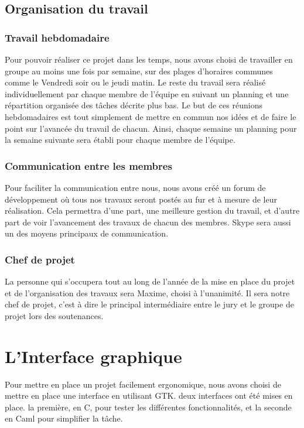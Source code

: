 \documentclass[12pt]{report}
\begin{document}
\section{Organisation du travail} %
		\subsection{Travail hebdomadaire}

Pour pouvoir réaliser ce projet dans les temps, nous avons choisi de travailler en groupe au moins une fois par semaine, sur des plages d'horaires communes comme le Vendredi soir ou le jeudi matin. Le reste du travail sera réalisé individuellement par chaque membre de l'équipe en suivant un planning et une répartition organisée des tâches décrite plus bas. Le but de ces réunions hebdomadaires est tout simplement de mettre en commun nos idées et de faire le point sur l'avancée du travail de chacun. Ainsi, chaque semaine un planning pour la semaine suivante sera établi pour chaque membre de l'équipe.

		\subsection{Communication entre les membres} %

Pour faciliter la communication entre nous, nous avons créé un forum de développement
o\`u tous nos travaux seront postés au fur et \`a  mesure de leur réalisation. Cela permettra d'une part, une meilleure gestion du travail, et d'autre part de voir l'avancement des travaux de chacun des membres. Skype sera aussi un des moyens principaux de communication.

		\subsection{Chef de projet}

La personne qui s'occupera tout au long de l'année de la mise en place du projet
et de l'organisation des travaux sera Maxime, choisi à l'unanimité. Il sera notre chef de projet, c'est à dire le principal intermédiaire entre le jury et le groupe de projet lors des soutenances.

\chapter{L'Interface graphique}

Pour mettre en place un projet facilement ergonomique, nous avons choisi de mettre en place une interface en utilisant GTK. deux interfaces ont été mises en place. la première, en C, pour tester les différentes fonctionnalités, et la seconde en Caml pour simplifier la tâche.
\end{document}
